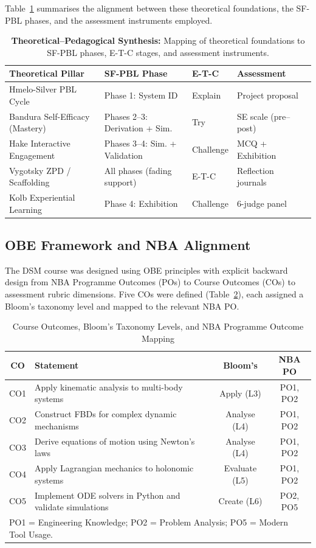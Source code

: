 \documentclass[utf8]{FrontiersinHarvard}
\begin{document}
Table~\ref{tab:synthesis} summarises the alignment between these theoretical
foundations, the SF-PBL phases, and the assessment instruments employed.

\begin{table}[h]
\caption{\textbf{Theoretical--Pedagogical Synthesis:} Mapping of theoretical
foundations to SF-PBL phases, E-T-C stages, and assessment instruments.}
\label{tab:synthesis}
\begin{tabular}{lllll}
\toprule
\textbf{Theoretical Pillar} & \textbf{SF-PBL Phase} & \textbf{E-T-C} & \textbf{Assessment} \\
\midrule
Hmelo-Silver PBL Cycle         & Phase 1: System ID       & Explain   & Project proposal  \\
Bandura Self-Efficacy (Mastery) & Phases 2--3: Derivation + Sim. & Try & SE scale (pre--post) \\
Hake Interactive Engagement    & Phases 3--4: Sim. + Validation & Challenge & MCQ + Exhibition  \\
Vygotsky ZPD / Scaffolding     & All phases (fading support)    & E-T-C     & Reflection journals \\
Kolb Experiential Learning     & Phase 4: Exhibition            & Challenge & 6-judge panel      \\
\bottomrule
\end{tabular}
\end{table}

\subsection{OBE Framework and NBA Alignment}

The DSM course was designed using OBE principles \citep{spady1994outcome}
with explicit backward design from NBA Programme Outcomes (POs) to Course
Outcomes (COs) to assessment rubric dimensions. Five COs were defined
(Table~\ref{tab:cos}), each assigned a Bloom's taxonomy level and mapped to
the relevant NBA PO.

\begin{table}[h]
\caption{Course Outcomes, Bloom's Taxonomy Levels, and NBA Programme Outcome Mapping}
\label{tab:cos}
\begin{tabular}{clcc}
\toprule
\textbf{CO} & \textbf{Statement} & \textbf{Bloom's} & \textbf{NBA PO} \\
\midrule
CO1 & Apply kinematic analysis to multi-body systems            & Apply (L3)    & PO1, PO2 \\
CO2 & Construct FBDs for complex dynamic mechanisms             & Analyse (L4)  & PO1, PO2 \\
CO3 & Derive equations of motion using Newton's laws            & Analyse (L4)  & PO1, PO2 \\
CO4 & Apply Lagrangian mechanics to holonomic systems           & Evaluate (L5) & PO1, PO2 \\
CO5 & Implement ODE solvers in Python and validate simulations  & Create (L6)   & PO2, PO5 \\
\bottomrule
\multicolumn{4}{l}{\small PO1 = Engineering Knowledge; PO2 = Problem Analysis; PO5 = Modern Tool Usage.}
\end{tabular}
\end{table}
\end{document}
